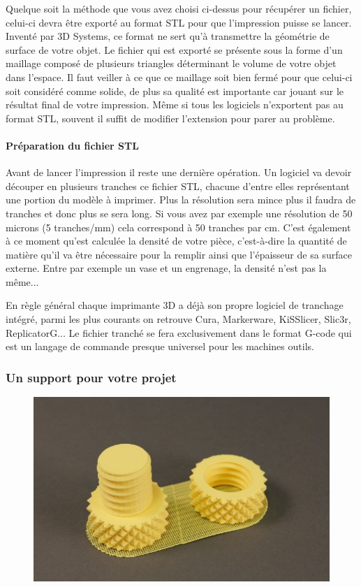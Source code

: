 \documentclass{article}
\begin{document}
Quelque soit la méthode que vous avez choisi ci-dessus pour récupérer un fichier, celui-ci devra être exporté au format STL pour que l'impression puisse se lancer. Inventé par 3D Systems, ce format ne sert qu'à transmettre la géométrie de surface de votre objet. Le fichier qui est exporté se présente sous la forme d'un maillage composé de plusieurs triangles déterminant le volume de votre objet dans l'espace. Il faut veiller à ce que ce maillage soit bien fermé pour que celui-ci soit considéré comme solide, de plus sa qualité est importante car jouant sur le résultat final de votre impression. Même si tous les logiciels n'exportent pas au format STL, souvent il suffit de modifier l'extension pour parer au problème.
\paragraph{Préparation du fichier STL}\hfill
 \par\leavevmode\par
Avant de lancer l'impression il reste une dernière opération. Un logiciel va devoir découper en plusieurs tranches ce fichier STL, chacune d'entre elles représentant une portion du modèle à imprimer. Plus la résolution sera mince plus il faudra de tranches et donc plus se sera long. Si vous avez par exemple une résolution de 50 microns (5 tranches/mm) cela correspond à 50 tranches par cm. C'est également à ce moment qu'est calculée la densité de votre pièce, c'est-à-dire la quantité de matière qu'il va être nécessaire pour la remplir ainsi que l'épaisseur de sa surface externe. Entre par exemple un vase et un engrenage, la densité n'est pas la même...
 \par\leavevmode\par
En règle général chaque imprimante 3D a déjà son propre logiciel de tranchage intégré, parmi les plus courants on retrouve Cura, Markerware, KiSSlicer, Slic3r, ReplicatorG... Le fichier tranché se fera exclusivement dans le format G-code qui est un langage de commande presque universel pour les machines outils.
\newpage
\subsubsection{Un support pour votre projet}
\begin{figure}[h!]
\centering
\includegraphics[scale=0.4]{./images/raftmakerbot.png}
\end{figure}\hfill
\end{document}
